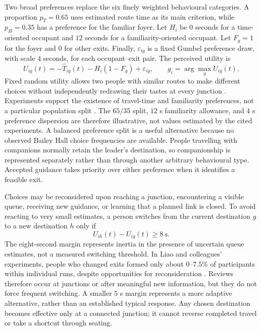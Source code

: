 \documentclass[11pt,a4paper]{article}
\begin{document}
Two broad preferences replace the six finely weighted behavioural categories. A proportion $p_T=0.65$ uses estimated route time as its main criterion, while $p_H=0.35$ has a preference for the familiar foyer. Let $H_i$ be $0$ seconds for a time-oriented occupant and $12$ seconds for a familiarity-oriented occupant. Let $F_g=1$ for the foyer and $0$ for other exits. Finally, $\varepsilon_{ig}$ is a fixed Gumbel preference draw, with scale $4$ seconds, for each occupant--exit pair. The perceived utility is
\begin{equation}\label{eq:utility}
U_{ig}(t)=-\widehat T_{ig}(t)-H_i(1-F_g)+\varepsilon_{ig},
\qquad g_i=\arg\max_{g}U_{ig}(t).
\end{equation}
Fixed random utility allows two people with similar routes to make different choices without independently redrawing their tastes at every junction \cite{train}. Experiments support the existence of travel-time and familiarity preferences, not a particular population split \cite{liao,fu2024}. The $65/35$ split, $12$ s familiarity allowance, and $4$ s preference dispersion are therefore illustrative, not values estimated by the cited experiments. A balanced preference split is a useful alternative because no observed Bailey Hall choice frequencies are available. People travelling with companions normally retain the leader's destination, so companionship is represented separately rather than through another arbitrary behavioural type. Accepted guidance takes priority over either preference when it identifies a feasible exit.

Choices may be reconsidered upon reaching a junction, encountering a visible queue, receiving new guidance, or learning that a planned link is closed. To avoid reacting to very small estimates, a person switches from the current destination $g$ to a new destination $h$ only if
\begin{equation}\label{eq:review}
U_{ih}(t)-U_{ig}(t)\geq8\ \mathrm{s}.
\end{equation}
The eight-second margin represents inertia in the presence of uncertain queue estimates, not a measured switching threshold. In Liao and colleagues' experiments, people who changed exits formed only about $0$--$7.5\%$ of participants within individual runs, despite opportunities for reconsideration \cite{liao}. Reviews therefore occur at junctions or after meaningful new information, but they do not force frequent switching. A smaller $5$ s margin represents a more adaptive alternative, rather than an established typical response. Any chosen destination becomes effective only at a connected junction; it cannot reverse completed travel or take a shortcut through seating.
\end{document}
